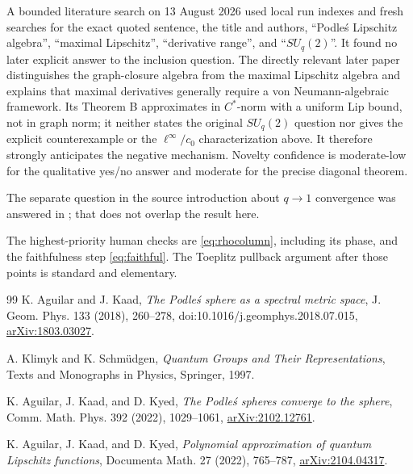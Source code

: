 \documentclass[11pt]{article}
\numberwithin{equation}{section}
\begin{document}
A bounded literature search on 13 August 2026 used local run indexes and
fresh searches for the exact quoted sentence, the title and authors,
``Podle\'s Lipschitz algebra'', ``maximal Lipschitz'', ``derivative range'',
and ``$SU_q(2)$''.  It found no later explicit answer to the inclusion
question.  The directly relevant later paper \cite{Approximation} distinguishes
the graph-closure algebra from the maximal Lipschitz algebra and explains that
maximal derivatives generally require a von Neumann-algebraic framework.  Its
Theorem B approximates in $C^*$-norm with a uniform Lip bound, not in graph
norm; it neither states the original $SU_q(2)$ question nor gives the explicit
counterexample or the $\ell^\infty/c_0$ characterization above.  It therefore
strongly anticipates the negative mechanism.  Novelty confidence is
moderate-low for the qualitative yes/no answer and moderate for the precise
diagonal theorem.

The separate question in the source introduction about $q\to1$ convergence
was answered in \cite{Convergence}; that does not overlap the result here.

The highest-priority human checks are \eqref{eq:rhocolumn}, including its phase, and the
faithfulness step \eqref{eq:faithful}.  The Toeplitz pullback argument after those points is
standard and elementary.

\begin{thebibliography}{99}
K. Aguilar and J. Kaad,
\emph{The Podle\'s sphere as a spectral metric space},
J. Geom. Phys. 133 (2018), 260--278,
doi:10.1016/j.geomphys.2018.07.015,
\href{https://arxiv.org/abs/1803.03027}{arXiv:1803.03027}.

A. Klimyk and K. Schm\"udgen,
\emph{Quantum Groups and Their Representations},
Texts and Monographs in Physics, Springer, 1997.

K. Aguilar, J. Kaad, and D. Kyed,
\emph{The Podle\'s spheres converge to the sphere},
Comm. Math. Phys. 392 (2022), 1029--1061,
\href{https://arxiv.org/abs/2102.12761}{arXiv:2102.12761}.

K. Aguilar, J. Kaad, and D. Kyed,
\emph{Polynomial approximation of quantum Lipschitz functions},
Documenta Math. 27 (2022), 765--787,
\href{https://arxiv.org/abs/2104.04317}{arXiv:2104.04317}.
\end{thebibliography}
\end{document}
